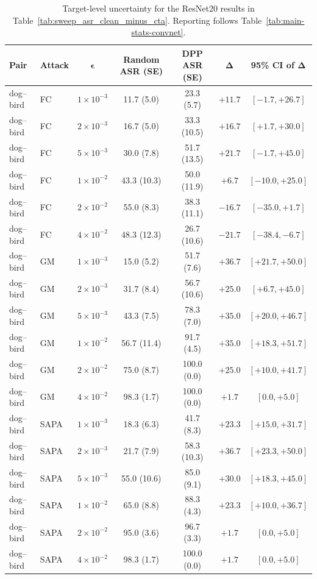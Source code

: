 \begin{table}[p]
\centering
\caption{
Target-level uncertainty for the ResNet20 results in
Table~\ref{tab:sweep_asr_clean_minus_cta}. Reporting follows
Table~\ref{tab:main-stats-convnet}.
}
\label{tab:main-stats-resnet}
\scriptsize
\setlength{\tabcolsep}{5pt}
\renewcommand{\arraystretch}{1.08}
\begin{tabular}{llccccc}
\toprule
\textbf{Pair} &
\textbf{Attack} &
$\boldsymbol{\epsilon}$ &
\textbf{Random ASR (SE)} &
\textbf{DPP ASR (SE)} &
$\boldsymbol{\Delta}$ &
\textbf{95\% CI of $\boldsymbol{\Delta}$} \\
\midrule

dog--bird & FC & $1{\times}10^{-3}$ & 11.7 (5.0) & 23.3 (5.7) & $+11.7$ & $[-1.7, +26.7]$ \\
dog--bird & FC & $2{\times}10^{-3}$ & 16.7 (5.0) & 33.3 (10.5) & $+16.7$ & $[+1.7, +30.0]$ \\
dog--bird & FC & $5{\times}10^{-3}$ & 30.0 (7.8) & 51.7 (13.5) & $+21.7$ & $[-1.7, +45.0]$ \\
dog--bird & FC & $1{\times}10^{-2}$ & 43.3 (10.3) & 50.0 (11.9) & $+6.7$ & $[-10.0, +25.0]$ \\
dog--bird & FC & $2{\times}10^{-2}$ & 55.0 (8.3) & 38.3 (11.1) & $-16.7$ & $[-35.0, +1.7]$ \\
dog--bird & FC & $4{\times}10^{-2}$ & 48.3 (12.3) & 26.7 (10.6) & $-21.7$ & $[-38.4, -6.7]$ \\
\addlinespace[2pt]

dog--bird & GM & $1{\times}10^{-3}$ & 15.0 (5.2) & 51.7 (7.6) & $+36.7$ & $[+21.7, +50.0]$ \\
dog--bird & GM & $2{\times}10^{-3}$ & 31.7 (8.4) & 56.7 (10.6) & $+25.0$ & $[+6.7, +45.0]$ \\
dog--bird & GM & $5{\times}10^{-3}$ & 43.3 (7.5) & 78.3 (7.0) & $+35.0$ & $[+20.0, +46.7]$ \\
dog--bird & GM & $1{\times}10^{-2}$ & 56.7 (11.4) & 91.7 (4.5) & $+35.0$ & $[+18.3, +51.7]$ \\
dog--bird & GM & $2{\times}10^{-2}$ & 75.0 (8.7) & 100.0 (0.0) & $+25.0$ & $[+10.0, +41.7]$ \\
dog--bird & GM & $4{\times}10^{-2}$ & 98.3 (1.7) & 100.0 (0.0) & $+1.7$ & $[0.0, +5.0]$ \\
\addlinespace[2pt]

dog--bird & SAPA & $1{\times}10^{-3}$ & 18.3 (6.3) & 41.7 (8.3) & $+23.3$ & $[+15.0, +31.7]$ \\
dog--bird & SAPA & $2{\times}10^{-3}$ & 21.7 (7.9) & 58.3 (10.3) & $+36.7$ & $[+23.3, +50.0]$ \\
dog--bird & SAPA & $5{\times}10^{-3}$ & 55.0 (10.6) & 85.0 (9.1) & $+30.0$ & $[+18.3, +45.0]$ \\
dog--bird & SAPA & $1{\times}10^{-2}$ & 65.0 (8.8) & 88.3 (4.3) & $+23.3$ & $[+10.0, +36.7]$ \\
dog--bird & SAPA & $2{\times}10^{-2}$ & 95.0 (3.6) & 96.7 (3.3) & $+1.7$ & $[0.0, +5.0]$ \\
dog--bird & SAPA & $4{\times}10^{-2}$ & 98.3 (1.7) & 100.0 (0.0) & $+1.7$ & $[0.0, +5.0]$ \\


\end{tabular}
\end{table}
